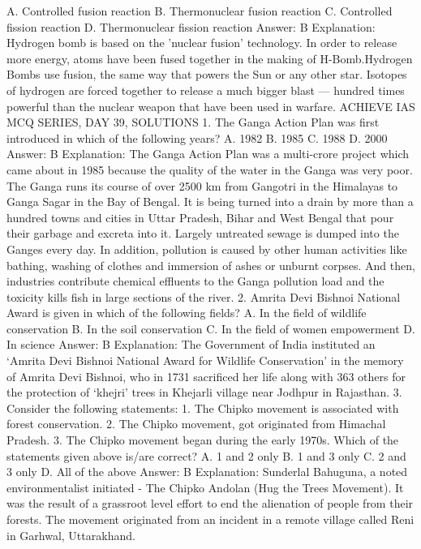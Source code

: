 A. Controlled fusion reaction
B. Thermonuclear fusion reaction
C. Controlled fission reaction
D. Thermonuclear fission reaction
Answer: B
Explanation: Hydrogen bomb is based on the 'nuclear fusion'
technology. In order to release more energy, atoms have been fused
together in the making of H-Bomb.Hydrogen Bombs use fusion, the
same way that powers the Sun or any other star. Isotopes of
hydrogen are forced together to release a much bigger blast —
hundred times powerful than the nuclear weapon that have been
used in warfare.
ACHIEVE IAS MCQ SERIES, DAY 39, SOLUTIONS
1. The Ganga Action Plan was first introduced in which of the
following years?
A. 1982
B. 1985
C. 1988
D. 2000
Answer: B
Explanation: The Ganga Action Plan was a multi-crore project which
came about in 1985 because the quality of the water in the Ganga was
very poor.
The Ganga runs its course of over 2500 km from Gangotri in the
Himalayas to Ganga Sagar in the Bay of Bengal.
It is being turned into a drain by more than a hundred towns and cities
in Uttar Pradesh, Bihar and West Bengal that pour their garbage and
excreta into it. Largely untreated sewage is dumped into the Ganges
every day.
In addition, pollution is caused by other human activities like bathing,
washing of clothes and immersion of ashes or unburnt corpses.
And then, industries contribute chemical effluents to the Ganga
pollution load and the toxicity kills fish in large sections of the river.
2. Amrita Devi Bishnoi National Award is given in which of the
following fields?
A. In the field of wildlife conservation
B. In the soil conservation
C. In the field of women empowerment
D. In science
Answer: B
Explanation: The Government of India instituted an ‘Amrita Devi
Bishnoi National Award for Wildlife Conservation’ in the memory of
Amrita Devi Bishnoi, who in 1731 sacrificed her life along with 363
others for the protection of ‘khejri’ trees in Khejarli village near
Jodhpur in Rajasthan.
3. Consider the following statements:
1. The Chipko movement is associated with forest conservation.
2. The Chipko movement, got originated from Himachal Pradesh.
3. The Chipko movement began during the early 1970s.
Which of the statements given above is/are correct?
A. 1 and 2 only
B. 1 and 3 only
C. 2 and 3 only
D. All of the above
Answer: B
Explanation: Sunderlal Bahuguna, a noted environmentalist initiated -
The Chipko Andolan (Hug the Trees Movement). It was the result of a
grassroot level effort to end the alienation of people from their
forests. The movement originated from an incident in a remote village
called Reni in Garhwal, Uttarakhand.
